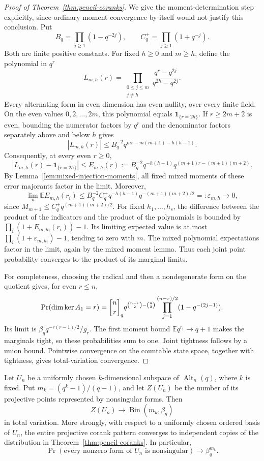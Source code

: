 \begin{proof}[Proof of Theorem~\ref{thm:pencil-coranks}]
We give the moment-determination step explicitly, since ordinary moment
convergence by itself would not justify this conclusion. Put
\[
 B_q=\prod_{j\ge1}(1-q^{-2j}),\qquad
 C_q^+=\prod_{j\ge1}(1+q^{-j}).
\]
Both are finite positive constants. For fixed $h\ge0$ and $m\ge h$, define
the polynomial in $q^r$
\[
 L_{m,h}(r)=\prod_{\substack{0\le j\le m\\j\ne h}}
            \frac{q^r-q^{2j}}{q^{2h}-q^{2j}}.
\]
Every alternating form in even dimension has even nullity, over every
finite field. On the even values $0,2,\ldots,2m$, this polynomial equals
$\mathbf1_{\{r=2h\}}$. If $r\ge2m+2$ is even, bounding the numerator
factors by $q^r$ and the denominator factors separately above and below
$h$ gives
\[
 |L_{m,h}(r)|
 \le B_q^{-2}q^{mr-m(m+1)-h(h-1)}.
\]
Consequently, at every even $r\ge0$,
\[
 \left|L_{m,h}(r)-\mathbf1_{\{r=2h\}}\right|
 \le E_{m,h}(r):=
 B_q^{-2}q^{-h(h-1)}q^{(m+1)r-(m+1)(m+2)}.
\]
By Lemma~\ref{lem:mixed-injection-moments}, all fixed mixed moments of
these error majorants factor in the limit. Moreover,
\[
 \lim_n\mathbb E E_{m,h}(r_i)
 \le B_q^{-2}C_q^+q^{-h(h-1)}q^{-(m+1)(m+2)/2}
 =:\varepsilon_{m,h}\longrightarrow0,
\]
since $M_{m+1}\le C_q^+q^{(m+1)(m+2)/2}$.
For fixed $h_1,\ldots,h_s$, the difference between the product of the
indicators and the product of the polynomials is bounded by
$\prod_i(1+E_{m,h_i}(r_i))-1$. Its limiting expected value is at most
$\prod_i(1+\varepsilon_{m,h_i})-1$, tending to zero with $m$.
The mixed polynomial expectations factor in the limit, again by the
mixed moment lemma. Thus each joint point probability converges to the
product of its marginal limits.

For completeness, choosing the radical and then a nondegenerate form on
the quotient gives, for even $r\le n$,
\[
 \Pr(\dim\ker A_1=r)
 =\qbinom{n}{r}
 q^{\binom{n-r}{2}-\binom n2}
 \prod_{j=1}^{(n-r)/2}(1-q^{-(2j-1)}).
\]
Its limit is $\beta_q q^{-r(r-1)/2}/g_r$. The first moment bound
$\mathbb E q^{r_i}\to q+1$ makes the marginals tight, so these probabilities
sum to one. Joint tightness follows by a union bound. Pointwise
convergence on the countable state space, together with tightness, gives
total-variation convergence.
\end{proof}

\begin{corollary}
\label{cor:binomial-pencil}
Let $U_n$ be a uniformly chosen $k$-dimensional subspace of
$\operatorname{Alt}_n(q)$, where $k$ is fixed. Put
$m_k=(q^k-1)/(q-1)$, and let $Z(U_n)$ be the number of its projective points
represented by nonsingular forms. Then
\[
 Z(U_n)\longrightarrow\operatorname{Bin}(m_k,\beta_q)
\]
in total variation. More strongly, with respect to a uniformly chosen
ordered basis of $U_n$, the entire projective corank pattern converges to
independent copies of the distribution in Theorem~\ref{thm:pencil-coranks}.
In particular,
\[
 \Pr(\text{every nonzero form of }U_n\text{ is nonsingular})
 \longrightarrow\beta_q^{m_k}.
\]
\end{corollary}

